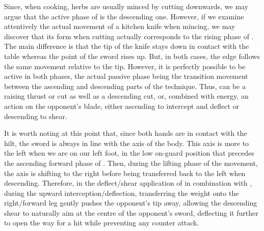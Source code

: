 Since, when cooking, herbs are usually minced by cutting downwards, we may argue that the active phase of \Duo{} is the descending one. However, if we examine attentively the actual movement of a kitchen knife when mincing, we may discover that its form when cutting actually corresponds to the rising phase of \Duo{}. The main difference is that the tip of the knife stays down in contact with the table whereas the point of the sword rises up. But, in both cases, the edge follows the same movement relative to the tip. 
However, it is perfectly possible to be active in both phases, the actual passive phase being the transition movement between the ascending and descending parts of the technique. Thus, \Duo{} can be a raising thrust or cut as well as a descending cut, or, combined with \Mo{} energy, an action on the opponent's blade, either ascending to intercept and deflect or descending to shear. 

It is worth noting at this point that, since both hands are in contact with the hilt, the sword is always in line with the axis of the body. This axis is more to the left when we are on our left foot, in the low on-guard position that precedes the ascending forward phase of \Duo{}. Then, during the lifting phase of the movement, the axis is shifting to the right before being transferred back to the left when descending. Therefore, in the deflect/shear application of  \Duo{} in combination with \Mo{}, during the upward interception/deflection, transferring the weight onto the right/forward leg gently pushes the opponent's tip away, allowing the descending shear to naturally aim at the centre of the opponent's sword, deflecting it further to open the way for a hit while preventing any counter attack. 


